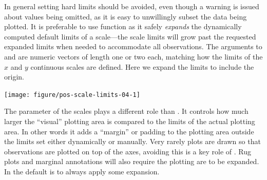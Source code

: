 \documentclass[krantz2]{krantz}\usepackage{knitr}%
\begin{document}
\begin{knitrout}\footnotesize
{}\color{fgcolor}\begin{kframe}
\begin{alltt}
  \hlstd{(}\hlstd{,} \hlstd{)}
\end{alltt}
\end{kframe}
\end{knitrout}

In general setting hard limits should be avoided, even though a warning is issued about  values being omitted, as it is easy to unwillingly subset the data being plotted.
It is preferable to use function  as it safely \emph{expands} the dynamically computed default limits of a scale---the scale limits will grow past the requested expanded limits when needed to accommodate all observations. The arguments to  and  are numeric vectors of length one or two each, matching how the limits of the $x$ and $y$ continuous scales are defined. Here we expand the limits to include the origin.

\begin{knitrout}\footnotesize
{}\color{fgcolor}\begin{kframe}
\begin{alltt}
  \hlopt{+}
  \hlstd{()} \hlopt{+}
  \hlstd{(} \hlstd{=} \hlstd{,}  \hlstd{=} \hlstd{)}
\end{alltt}
\end{kframe}

{\centering \texttt{[image: figure/pos-scale-limits-04-1]} 

}



\end{knitrout}

The  parameter of the scales plays a different role than . It controls how much larger the ``visual'' plotting area is compared to the limits of the actual plotting area. In other words it adds a ``margin'' or padding to the plotting area outside the limits set either dynamically or manually. Very rarely plots are drawn so that observations are plotted on top of the axes, avoiding this is a key role of . Rug plots and marginal annotations will also require the plotting are to be expanded. In \ggplot the default is to always apply some expansion.
\end{document}

